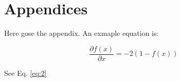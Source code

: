 \section{Appendices} \label{appdx}
Here gose the appendix. An exmaple equation is:

\begin{equation}
\frac{\partial f(x)}{\partial x} =  -2 (1 - f(x))
\label{eq:2}
\end{equation}

See Eq. \ref{eq:2}
